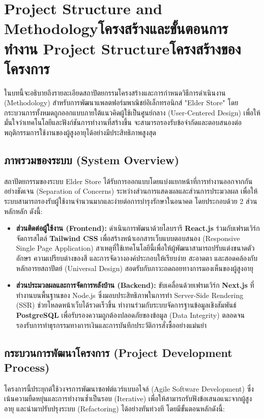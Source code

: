 \chapter{\ifproject%
\ifenglish Project Structure and Methodology\else โครงสร้างและขั้นตอนการทำงาน\fi
\else%
\ifenglish Project Structure\else โครงสร้างของโครงการ\fi
\fi}

ในบทนี้จะอธิบายถึงรายละเอียดสถาปัตยกรรมโครงสร้างและการกำหนดวิธีการดำเนินงาน (Methodology) สำหรับการพัฒนาแพลตฟอร์มพาณิชย์อิเล็กทรอนิกส์ "Elder Store" โดยกระบวนการทั้งหมดถูกออกแบบภายใต้แนวคิดผู้ใช้เป็นศูนย์กลาง (User-Centered Design) เพื่อให้มั่นใจว่าเทคโนโลยีและฟังก์ชันการทำงานที่สร้างขึ้น จะสามารถรองรับข้อจำกัดและตอบสนองต่อพฤติกรรมการใช้งานของผู้สูงอายุได้อย่างมีประสิทธิภาพสูงสุด

\section{ภาพรวมของระบบ (System Overview)}
สถาปัตยกรรมของระบบ Elder Store ได้รับการออกแบบโดยแบ่งแยกหน้าที่การทำงานออกจากกันอย่างชัดเจน (Separation of Concerns) ระหว่างส่วนการแสดงผลและส่วนการประมวลผล เพื่อให้ระบบสามารถรองรับผู้ใช้งานจำนวนมากและง่ายต่อการบำรุงรักษาในอนาคต โดยประกอบด้วย 2 ส่วนหลักหลัก ดังนี้:
\begin{itemize}
  \item \textbf{ส่วนติดต่อผู้ใช้งาน (Frontend):} ดำเนินการพัฒนาด้วยไลบรารี \textbf{React.js} ร่วมกับเฟรมเวิร์กจัดการสไตล์ \textbf{Tailwind CSS} เพื่อสร้างหน้าเอกสารเว็บแบบตอบสนอง (Responsive Single Page Application) สาเหตุที่ใช้เทคโนโลยีนี้เพื่อให้ผู้พัฒนาสามารถปรับแต่งขนาดตัวอักษร ความเปรียบต่างของสี และการจัดวางองค์ประกอบให้เรียบง่าย สะอาดตา และสอดคล้องกับหลักอารยสถาปัตย์ (Universal Design) สอดรับกับภาวะถดถอยทางการมองเห็นของผู้สูงอายุ
  \item \textbf{ส่วนประมวลผลและการจัดการหลังบ้าน (Backend):} ขับเคลื่อนด้วยเฟรมเวิร์ก \textbf{Next.js} ที่ทำงานบนพื้นฐานของ Node.js ซึ่งมอบประสิทธิภาพในการทำ Server-Side Rendering (SSR) ช่วยโหลดหน้าเว็บได้รวดเร็วขึ้น ทำงานร่วมกับระบบจัดการฐานข้อมูลเชิงสัมพันธ์ \textbf{PostgreSQL} เพื่อรับรองความถูกต้องปลอดภัยของข้อมูล (Data Integrity) ตลอดจนรองรับการทำธุรกรรมทางการเงินและการบันทึกประวัติการสั่งซื้ออย่างแม่นยำ
\end{itemize}

\section{กระบวนการพัฒนาโครงการ (Project Development Process)}
โครงการนี้ประยุกต์ใช้วงจรการพัฒนาซอฟต์แวร์แบบอไจล์ (Agile Software Development) ซึ่งเน้นความยืดหยุ่นและการทำงานซ้ำเป็นรอบ (Iterative) เพื่อให้สามารถรับฟังข้อเสนอแนะจากผู้สูงอายุ และนำมาปรับปรุงระบบ (Refactoring) ได้อย่างทันท่วงที โดยมีขั้นตอนหลักดังนี้:

